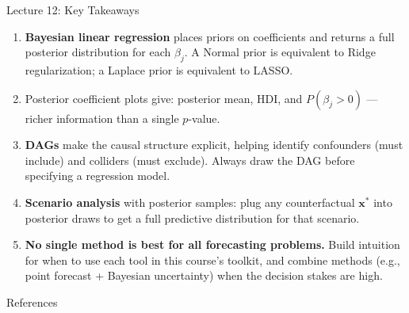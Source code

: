 \documentclass[aspectratio=169, 11pt]{beamer}
\begin{document}
\begin{frame}{Lecture 12: Key Takeaways}
  \begin{keybox}
    {\small
    \begin{enumerate}
      \item \textbf{Bayesian linear regression} places priors on coefficients
            and returns a full posterior distribution for each $\beta_j$.
            A Normal prior is equivalent to Ridge regularization;
            a Laplace prior is equivalent to LASSO.

      \item Posterior coefficient plots give:
            posterior mean, HDI, and $P(\beta_j > 0)$ ---
            richer information than a single $p$-value.

      \item \textbf{DAGs} make the causal structure explicit,
            helping identify confounders (must include) and
            colliders (must exclude). Always draw the DAG before
            specifying a regression model.

      \item \textbf{Scenario analysis} with posterior samples:
            plug any counterfactual $\mathbf{x}^*$ into posterior draws
            to get a full predictive distribution for that scenario.

      \item \textbf{No single method is best for all forecasting problems.}
            Build intuition for when to use each tool in this course's toolkit,
            and combine methods (e.g., point forecast + Bayesian uncertainty)
            when the decision stakes are high.
    \end{enumerate}
    }
  \end{keybox}
\end{frame}

\begin{frame}[allowframebreaks]{References}
  \printbibliography[heading=none]
\end{frame}

\end{document}
